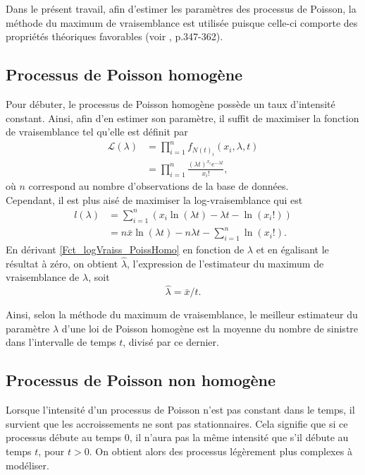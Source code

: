 	Dans le présent travail, afin d'estimer les paramètres des processus de Poisson, la méthode du maximum de vraisemblance est utilisée puisque celle-ci comporte des propriétés théoriques favorables (voir \cite{Edward_MaximumLikelyhood1988}, p.347-362). \\
	
	\subsection{Processus de Poisson homogène}
		 Pour débuter, le processus de Poisson homogène possède un taux d'intensité constant. Ainsi, afin d'en estimer son paramètre, il suffit de maximiser la fonction de vraisemblance tel qu'elle est définit par
		\begin{align}
			\mathcal{L}\left(\lambda\right)  
			&= \prod_{i=1}^{n} f_{N(t)_i} \left( x_i, \lambda, t \right) \nonumber\\
			&= \prod_{i=1}^{n} \frac{ \left( \lambda t \right)^{x_i} e^{-\lambda t} }{x_i!}, \label{Fct_Vraiss_PoissHomo}
		\end{align}
		où $n$ correspond au nombre d'observations de la base de données.\\
		Cependant, il est plus aisé de maximiser la log-vraisemblance qui est
		\begin{align}
			l \left(\lambda \right)  
			&= \sum_{i=1}^{n}  \left( x_i \ln\left(\lambda t\right)-\lambda t - \ln \left(x_i!\right)  \right) \nonumber\\
			&= n \bar{x} \ln \left( \lambda t \right) - n\lambda t - \sum_{i=1}^{n}\ln \left(x_i!\right). \label{Fct_logVraiss_PoissHomo}
		\end{align}
		En dérivant \ref{Fct_logVraiss_PoissHomo} en fonction de $\lambda$ et en égalisant le résultat à zéro, on obtient $\hat{\lambda}$, l'expression de l'estimateur du maximum de vraisemblance de $\lambda$, soit
		$$	\hat{\lambda} = \bar{x}/t. $$
		
		Ainsi, selon la méthode du maximum de vraisemblance, le meilleur estimateur du paramètre $\lambda$ d'une loi de Poisson homogène est la moyenne du nombre de sinistre dans l'intervalle de temps $t$, divisé par ce dernier.
		
	\subsection{Processus de Poisson non homogène}
		Lorsque l'intensité d'un processus de Poisson n'est pas constant dans le temps, il survient que les accroissements ne sont pas stationnaires. Cela signifie que si ce processus débute au temps 0, il n'aura pas la même intensité que s'il débute au temps $t$, pour $t>0$. On obtient alors des processus légèrement plus complexes à modéliser. \\
		
